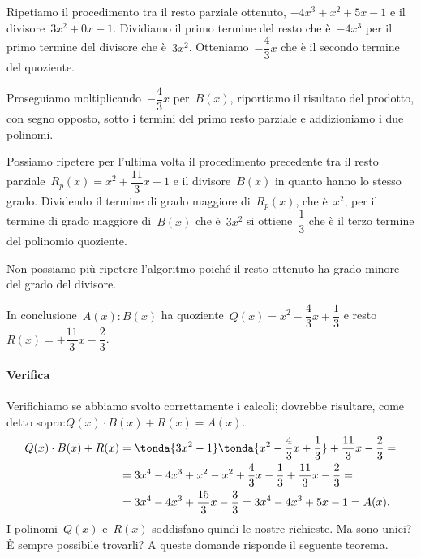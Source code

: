 \begin{esempio}
\begin{enumerate*}
\begin{center}
%  
\divpold
\end{center}
 \item 
 Ripetiamo il procedimento tra il resto parziale ottenuto, 
 \(-4x^{3}+x^{2}+5x-1\) e il divisore~\(3x^{2}+0x-1\). Dividiamo il primo termine 
 del resto che
 è~\(-4x^{3}\) per il primo termine del divisore che è~\(3x^{2}\). 
 Otteniamo~\(-{\dfrac{4}{3}}x\) che è il secondo termine del quoziente.

\begin{center}
%  
 \divpole
\end{center}
 \item 
 Proseguiamo moltiplicando~\(-{\dfrac{4}{3}}x\) per~\(B(x)\), riportiamo il 
 risultato del prodotto, con segno opposto, sotto i
 termini del primo resto parziale e addizioniamo i due polinomi.
\begin{center}
% 
\divpolf
\end{center}
 \item 
 Possiamo ripetere per l'ultima volta il procedimento precedente tra il 
 resto parziale~\(R_{p}(x)=x^{2}+\dfrac{11}{3}x-1\) e
 il divisore~\(B(x)\) in quanto hanno lo stesso grado. Dividendo il termine di 
 grado maggiore di~\(R_{p}(x)\), che è~\(x^{2}\),
 per il termine di grado maggiore di~\(B(x)\) che è~\(3x^{2}\) si 
 ottiene~\(\dfrac{1}{3}\) che è il terzo termine del polinomio quoziente.
\begin{center}
% 
\divpolg
\end{center}
\end{enumerate*}

Non possiamo più ripetere l'algoritmo poiché il resto ottenuto ha grado minore 
del grado del divisore.

In conclusione~\(A(x):B(x)\) ha 
quoziente~\(Q(x)=x^{2}-\dfrac{4}{3}x+\dfrac{1}{3}\) e 
resto~\(R(x)=+{\dfrac{11}{3}}x-\dfrac{2}{3}\).

\paragraph{Verifica}
Verifichiamo se abbiamo svolto correttamente i calcoli; dovrebbe risultare, 
come detto sopra:\(Q(x)\cdot B(x)+R(x) = A(x)\).
\begin{equation*}
\begin{split}
Q(x)\cdot B(x)+R(x) &= 
\tonda{3x^{2}-1}\tonda{x^{2}-\dfrac{4}{3}x+\dfrac{1}{3}}+
\dfrac{11}{3}x-\dfrac{2}{3} =\\ 
&=3x^{4}-4x^{3}+x^{2}-x^{2}+\dfrac{4}{3}x-
  \dfrac{1}{3}+\dfrac{11}{3}x-\dfrac{2}{3}=\\
&= 3x^{4}-4x^{3}+\dfrac{15}{3}x-\dfrac{3}{3}
= 3x^{4}-4x^{3}+5x-1 = A(x).
\end{split}
\end{equation*}
I polinomi~\(Q(x)\) e~\(R(x)\) soddisfano quindi le nostre richieste. 
Ma sono unici? È sempre possibile trovarli? 
A queste domande risponde il seguente teorema.
 \end{esempio}

